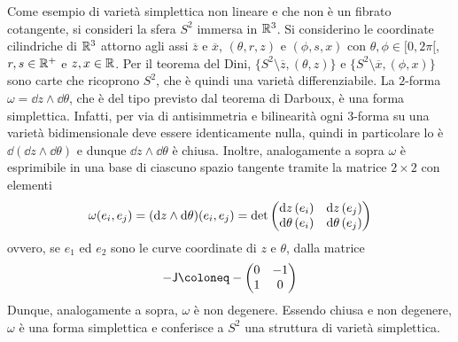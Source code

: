 Come esempio di varietà simplettica non lineare e che non è un fibrato cotangente, si consideri la sfera $S^2$ immersa in $\mathbb{R}^3$. Si considerino le coordinate cilindriche di $\mathbb{R}^3$ attorno agli assi $\overline{z}$ e $\overline{x}$, $(\theta,r,z)$ e $(\phi, s, x)$ con $\theta,\phi \in [0,2\pi[$, $r,s \in \mathbb{R}^+$ e $z,x \in \mathbb{R}$. Per il teorema del Dini, $\big\lbrace S^2 \setminus \overline{z}, (\theta,z)\big\rbrace$ e $\big\lbrace S^2 \setminus \overline{x}, (\phi,x)\big\rbrace$ sono carte che ricoprono $S^2$, che è quindi una varietà differenziabile. La $2$-forma $\omega = \dd{z} \wedge \dd{\theta}$, che è del tipo previsto dal teorema di Darboux, è una forma simplettica. Infatti, per via di antisimmetria e bilinearità ogni $3$-forma su una varietà bidimensionale deve essere identicamente nulla, quindi in particolare lo è $\dd (\dd z \wedge \dd \theta)$ e dunque $\dd z \wedge \dd \theta$ è chiusa. Inoltre, analogamente a sopra $\omega$ è esprimibile in una base di ciascuno spazio tangente tramite la matrice $2\times 2$ con elementi
\begin{equation}
\omega(e_i,e_j) = (\dd{z} \wedge \dd{\theta}) (e_i, e_j) = \det\pmqty{\dd{z}(e_i) & \dd{z}(e_j) \\ \dd{\theta}(e_i) & \dd{\theta}(e_j)}
\end{equation} 
ovvero, se $e_1$ ed $e_2$ sono le curve coordinate di $z$ e $\theta$, dalla matrice
\begin{equation}
  - \mathsf{J} \defeq - \pmqty{0 & -1 \\ 1 & 0}
\end{equation}
Dunque, analogamente a sopra, $\omega$ è non degenere. Essendo chiusa e non degenere, $\omega$ è una forma simplettica e conferisce a $S^2$ una struttura di varietà simplettica.

